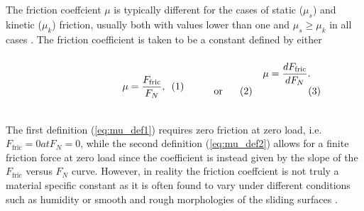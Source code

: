 The friction coeffcient $\mu$ is typically different for the cases of static ($\mu_s$)
and kinetic ($\mu_k$) friction, usually both with values lower than one and $\mu_s \ge \mu_k$ in all cases \cite[p. 6]{gnecco_meyer_2015}. The friction coefficient is taken to be a constant defined by either \cite{gao_frictional_2004} \\
\vspace{0.1cm}
\begin{subequations}
\noindent\begin{minipage}{.2\linewidth}
  \hfill
\end{minipage}
\begin{minipage}[b]{0.2\linewidth}
  \begin{align}
    \mu = \frac{F_{\text{fric}}}{F_N},
    \label{eq:mu_def1}
  \end{align}
\end{minipage}
\begin{minipage}[b]{0.2\linewidth}
  \begin{align*}
    \text{or}
  \end{align*}
\end{minipage}
\begin{minipage}[b]{0.2\linewidth}
  \begin{align}
    \mu = \frac{dF_{\text{fric}}}{dF_N}.
    \label{eq:mu_def2}
  \end{align}
\end{minipage}
\begin{minipage}{.2\linewidth}
\end{minipage}
\label{eq:mu_def}
\end{subequations}
\vspace{0.1cm}
\\
\noindent The first definition (\ref{eq:mu_def1}) requires zero friction at zero load, i.e.\ $F_{\text{fric}} = 0 at F_N = 0$, while the second definition (\ref{eq:mu_def2}) allows for a finite friction force at zero load since the coefficient is instead given by the slope of the $F_{\text{fric}}$ versus $F_N$ curve. However, in reality the friction coeffcient is not truly a material specific constant as it is often found to vary under different conditions such as humidity or smooth and rough morphologies of the sliding surfaces \cite{gao_frictional_2004}. 




